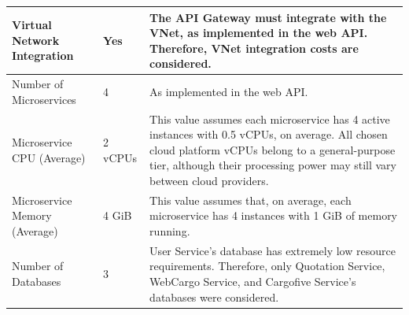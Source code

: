 \documentclass[12pt, reqno, oneside]{amsbook}
\theoremstyle{definition}
\theoremstyle{definition}
\numberwithin{section}{chapter}
\numberwithin{table}{chapter}
\numberwithin{figure}{chapter}
\begin{document}
\begin{longtable}{|M{70pt}|M{55pt}|m{300pt}|}
  \hline
  Virtual Network Integration
   & Yes
   & The \ac{API} Gateway must integrate with the \ac{VNet}, as implemented in the web \ac{API}. Therefore, \ac{VNet} integration costs are considered.                                                                                                                                                                                                                                                                                                                                  \\
  \hline
  Number of Microservices
   & 4
   & As implemented in the web \ac{API}.                                                                                                                                                                                                                                                                                                                                                                                                                                                 \\
  \hline
  Microservice CPU (Average)
   & 2 vCPUs
   & This value assumes each microservice has 4 active instances with 0.5 \acp{vCPU}, on average. All chosen cloud platform \acp{vCPU} belong to a general-purpose tier, although their processing power may still vary between cloud providers.                                                                                                                                                                                                                                         \\
  \hline
  Microservice Memory (Average)
   & 4 GiB
   & This value assumes that, on average, each microservice has 4 instances with 1 \ac{GiB} of memory running.                                                                                                                                                                                                                                                                                                                                                                           \\
  \hline
  Number of Databases
   & 3
   & User Service's database has extremely low resource requirements. Therefore, only Quotation Service, WebCargo Service, and Cargofive Service's databases were considered.                                                                                                                                                                                                                                                                                                            \\

\end{longtable}
\end{document}
